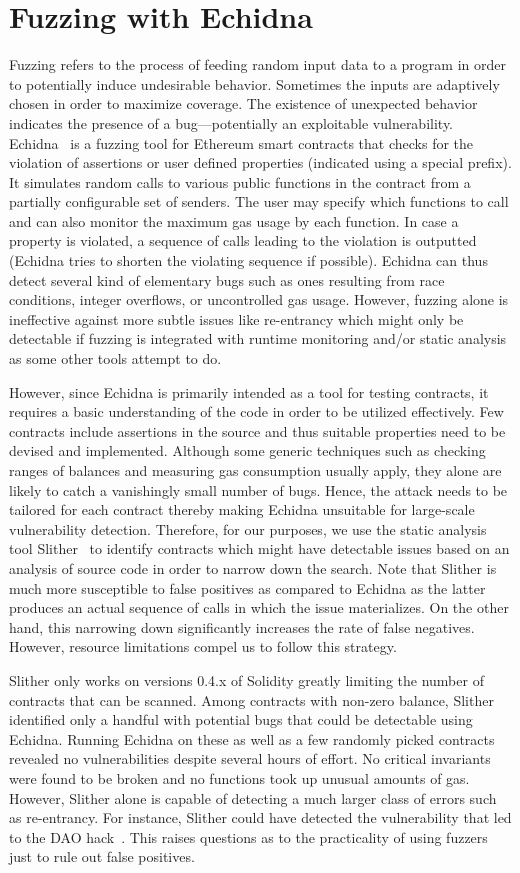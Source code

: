 \section{Fuzzing with Echidna}
Fuzzing refers to the process of feeding random input data to a program in order to potentially induce undesirable behavior. Sometimes the inputs are adaptively chosen in order to maximize coverage. The existence of unexpected behavior indicates the presence of a bug---potentially an exploitable vulnerability. Echidna~\cite{echidna} is a fuzzing tool for Ethereum smart contracts that checks for the violation of assertions or user defined properties (indicated using a special prefix). It simulates random calls to various public functions in the contract from a partially configurable set of senders. The user may specify which functions to call and can also monitor the maximum gas usage by each function. In case a property is violated, a sequence of calls leading to the violation is outputted (Echidna tries to shorten the violating sequence if possible). Echidna can thus detect several kind of elementary bugs such as ones resulting from race conditions, integer overflows, or uncontrolled gas usage. However, fuzzing alone is ineffective against more subtle issues like re-entrancy which might only be detectable if fuzzing is integrated with runtime monitoring and/or static analysis as some other tools attempt to do.

However, since Echidna is primarily intended as a tool for testing contracts, it requires a basic understanding of the code in order to be utilized effectively. Few contracts include assertions in the source and thus suitable properties need to be devised and implemented. Although some generic techniques such as checking ranges of balances and measuring gas consumption usually apply, they alone are likely to catch a vanishingly small number of bugs. Hence, the attack needs to be tailored for each contract thereby making Echidna unsuitable for large-scale vulnerability detection. Therefore, for our purposes, we use the static analysis tool Slither~\cite{slither} to identify contracts which might have detectable issues based on an analysis of source code in order to narrow down the search. Note that Slither is much more susceptible to false positives as compared to Echidna as the latter produces an actual sequence of calls in which the issue materializes. On the other hand, this narrowing down significantly increases the rate of false negatives. However, resource limitations compel us to follow this strategy.

Slither only works on versions 0.4.x of Solidity greatly limiting the number of contracts that can be scanned. Among contracts with non-zero balance, Slither identified only a handful with potential bugs that could be detectable using Echidna. Running Echidna on these as well as a few randomly picked contracts revealed no vulnerabilities despite several hours of effort. No critical invariants were found to be broken and no functions took up unusual amounts of gas. However, Slither alone is capable of detecting a much larger class of errors such as re-entrancy. For instance, Slither could have detected the vulnerability that led to the DAO hack~\cite{slither}. This raises questions as to the practicality of using fuzzers just to rule out false positives.